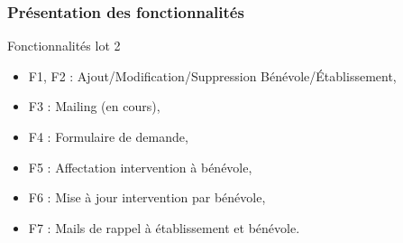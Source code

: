 \speaker{\Francois}

\begin{frame}
\frametitle{Présentation des fonctionnalités}
\begin{block}{Fonctionnalités lot 2}
	\begin{itemize}
		\item F1, F2 : Ajout/Modification/Suppression Bénévole/Établissement,
		\item F3 : Mailing (en cours),
		\item F4 : Formulaire de demande,
		\item F5 : Affectation intervention à bénévole,
		\item F6 : Mise à jour intervention par bénévole,
		\item F7 : Mails de rappel à établissement et bénévole.
	\end{itemize}
\end{block}
\end{frame}
